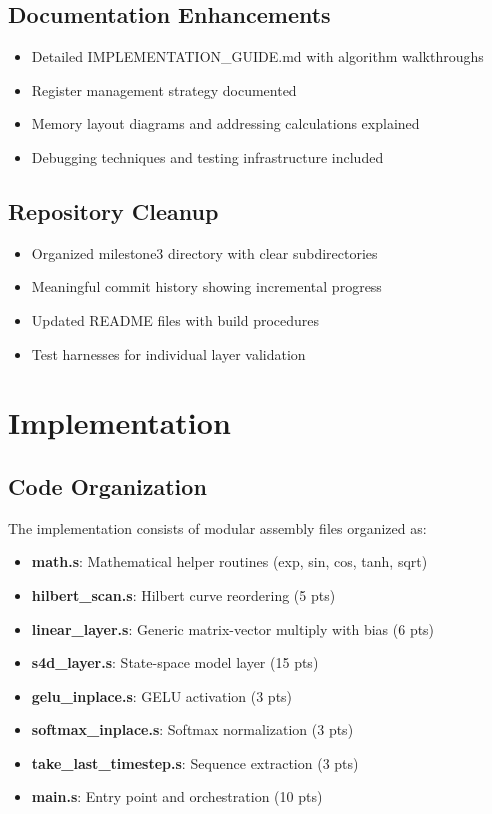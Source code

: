 \documentclass[conference]{IEEEtran}
\begin{document}
\subsection{Documentation Enhancements}
\begin{itemize}
    \item Detailed IMPLEMENTATION\_GUIDE.md with algorithm walkthroughs
    \item Register management strategy documented
    \item Memory layout diagrams and addressing calculations explained
    \item Debugging techniques and testing infrastructure included
\end{itemize}

\subsection{Repository Cleanup}
\begin{itemize}
    \item Organized milestone3 directory with clear subdirectories
    \item Meaningful commit history showing incremental progress
    \item Updated README files with build procedures
    \item Test harnesses for individual layer validation
\end{itemize}

\section{Implementation}

\subsection{Code Organization}

The implementation consists of modular assembly files organized as:

\begin{itemize}
    \item \textbf{math.s}: Mathematical helper routines (exp, sin, cos, tanh, sqrt)
    \item \textbf{hilbert\_scan.s}: Hilbert curve reordering (5 pts)
    \item \textbf{linear\_layer.s}: Generic matrix-vector multiply with bias (6 pts)
    \item \textbf{s4d\_layer.s}: State-space model layer (15 pts)
    \item \textbf{gelu\_inplace.s}: GELU activation (3 pts)
    \item \textbf{softmax\_inplace.s}: Softmax normalization (3 pts)
    \item \textbf{take\_last\_timestep.s}: Sequence extraction (3 pts)
    \item \textbf{main.s}: Entry point and orchestration (10 pts)
\end{itemize}
\end{document}
